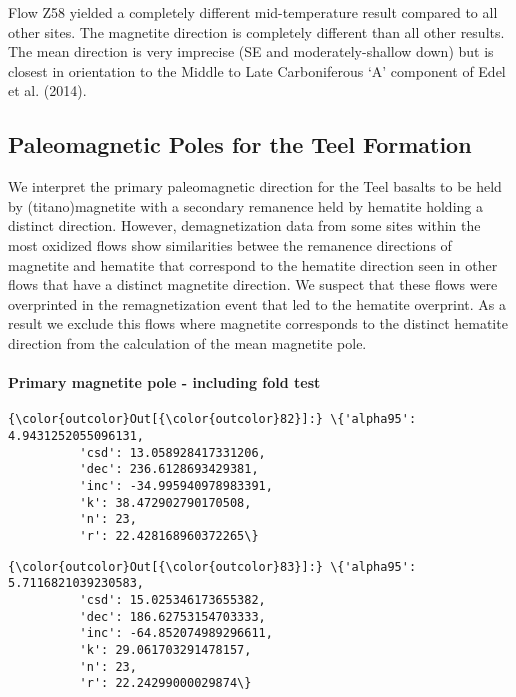 \documentclass[11pt]{article}
\begin{document}
    Flow Z58 yielded a completely different mid-temperature result compared
to all other sites. The magnetite direction is completely different than
all other results. The mean direction is very imprecise (SE and
moderately-shallow down) but is closest in orientation to the Middle to
Late Carboniferous `A' component of Edel et al. (2014).

    \subsection{Paleomagnetic Poles for the Teel
Formation}\label{paleomagnetic-poles-for-the-teel-formation}

    We interpret the primary paleomagnetic direction for the Teel basalts to
be held by (titano)magnetite with a secondary remanence held by hematite
holding a distinct direction. However, demagnetization data from some
sites within the most oxidized flows show similarities betwee the
remanence directions of magnetite and hematite that correspond to the
hematite direction seen in other flows that have a distinct magnetite
direction. We suspect that these flows were overprinted in the
remagnetization event that led to the hematite overprint. As a result we
exclude this flows where magnetite corresponds to the distinct hematite
direction from the calculation of the mean magnetite pole.

    \paragraph{Primary magnetite pole - including fold
test}\label{primary-magnetite-pole---including-fold-test}




            \begin{Verbatim}[commandchars=\\\{\}]
{\color{outcolor}Out[{\color{outcolor}82}]:} \{'alpha95': 4.9431252055096131,
          'csd': 13.058928417331206,
          'dec': 236.6128693429381,
          'inc': -34.995940978983391,
          'k': 38.472902790170508,
          'n': 23,
          'r': 22.428168960372265\}
\end{Verbatim}
        

            \begin{Verbatim}[commandchars=\\\{\}]
{\color{outcolor}Out[{\color{outcolor}83}]:} \{'alpha95': 5.7116821039230583,
          'csd': 15.025346173655382,
          'dec': 186.62753154703333,
          'inc': -64.852074989296611,
          'k': 29.061703291478157,
          'n': 23,
          'r': 22.24299000029874\}
\end{Verbatim}
        
\end{document}
